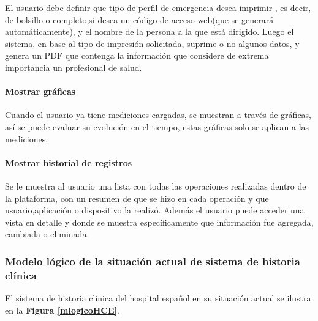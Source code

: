 {El usuario debe definir que tipo de perfil de emergencia desea imprimir , es decir, de bolsillo o completo,si desea un código de acceso web(que se generará automáticamente), y el nombre de la persona a la que está dirigido. Luego el sistema, en base al tipo de impresión solicitada, suprime o no algunos datos, y genera un PDF que contenga la información que considere de extrema importancia un profesional de salud.

\paragraph{Mostrar gráficas}

Cuando el usuario ya tiene mediciones cargadas, se muestran a través de gráficas, así se puede evaluar su evolución en el tiempo, estas gráficas solo se aplican a las mediciones.

\paragraph{Mostrar historial de registros}

Se le muestra al usuario una lista con todas las operaciones realizadas dentro de la plataforma, con un resumen de que se hizo en cada operación y que usuario,aplicación o dispositivo la realizó. Además el usuario puede acceder una vista en detalle y donde se muestra específicamente que información fue agregada, cambiada o eliminada.
}

\subsubsection{Modelo lógico de la situación actual de sistema de historia clínica}
El sistema de historia clínica del hospital español en su situación actual se ilustra en la \textbf{Figura \ref{mlogicoHCE}}.


